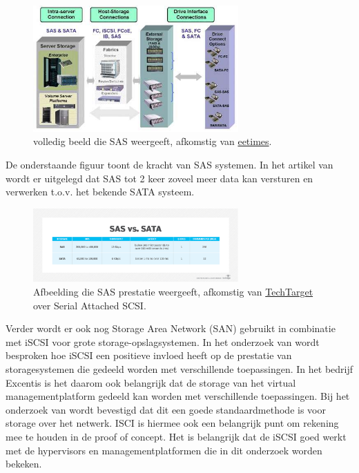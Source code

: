 \begin{figure}[h!]
    \centering
    \includegraphics[width=0.7\textwidth]{../onderzoek/storagesas-das.jpg} 
    \caption{volledig beeld die SAS weergeeft, afkomstig van \href{https://www.eetimes.com/serial-attached-scsi-storage-moves-ahead-in-network-server-designs/}{eetimes}.}
    \label{fig:sas}
\end{figure}

\FloatBarrier
De onderstaande figuur toont de kracht van SAS systemen. In het artikel van \textcite{loshin2022sas} wordt er uitgelegd dat SAS tot 2 keer zoveel meer data kan versturen en verwerken t.o.v. het bekende SATA systeem.

\begin{figure}[h!]
    \centering
    \includegraphics[width=0.7\textwidth]{../onderzoek/sas_vs_sata-f.png} 
    \caption{Afbeelding die SAS prestatie weergeeft, afkomstig van \href{https://www.techtarget.com/searchstorage/definition/serial-attached-SCSI}{TechTarget} over Serial Attached SCSI.}
    \label{fig:saspres}
\end{figure}


\FloatBarrier
Verder wordt er ook nog Storage Area Network (SAN) gebruikt in combinatie met iSCSI voor grote storage-opslagsystemen. In het onderzoek van \textcite{park2024performance} wordt besproken hoe iSCSI een positieve invloed heeft op de prestatie van storagesystemen die gedeeld worden met verschillende toepassingen.
In het bedrijf Excentis is het daarom ook belangrijk dat de storage van het virtual managementplatform gedeeld kan worden met verschillende toepassingen. Bij het onderzoek van \textcite{park2024performance} wordt bevestigd dat dit een goede standaardmethode is voor storage over het netwerk.
ISCI is hiermee ook een belangrijk punt om rekening mee te houden in de proof of concept. Het is belangrijk dat de iSCSI goed werkt met de hypervisors en managementplatformen die in dit onderzoek worden bekeken.

